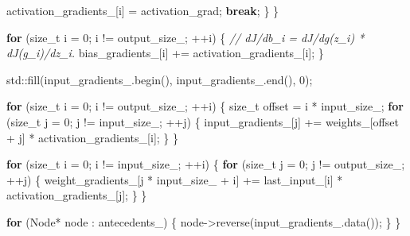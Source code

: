 \documentclass[
]{article}
\newenvironment{Shaded}{}{}
\newcommand{\BuiltInTok}[1]{#1}
\newcommand{\CommentTok}[1]{\textcolor[rgb]{0.38,0.63,0.69}{\textit{#1}}}
\newcommand{\ControlFlowTok}[1]{\textcolor[rgb]{0.00,0.44,0.13}{\textbf{#1}}}
\newcommand{\DataTypeTok}[1]{\textcolor[rgb]{0.56,0.13,0.00}{#1}}
\newcommand{\DecValTok}[1]{\textcolor[rgb]{0.25,0.63,0.44}{#1}}
\newcommand{\NormalTok}[1]{#1}
\newcommand{\VariableTok}[1]{\textcolor[rgb]{0.10,0.09,0.49}{#1}}
\begin{document}
\begin{Shaded}
\begin{Highlighting}[]
            \VariableTok{activation\_gradients\_}\NormalTok{[i] = activation\_grad;}
            \ControlFlowTok{break}\NormalTok{;}
\NormalTok{        \}}
\NormalTok{    \}}

    \ControlFlowTok{for}\NormalTok{ (}\DataTypeTok{size\_t}\NormalTok{ i = }\DecValTok{0}\NormalTok{; i != }\VariableTok{output\_size\_}\NormalTok{; ++i)}
\NormalTok{    \{}
        \CommentTok{// dJ/db\_i = dJ/dg(z\_i) * dJ(g\_i)/dz\_i.}
        \VariableTok{bias\_gradients\_}\NormalTok{[i] += }\VariableTok{activation\_gradients\_}\NormalTok{[i];}
\NormalTok{    \}}

    \BuiltInTok{std::}\NormalTok{fill(}\VariableTok{input\_gradients\_}\NormalTok{.begin(), }\VariableTok{input\_gradients\_}\NormalTok{.end(), }\DecValTok{0}\NormalTok{);}

    \ControlFlowTok{for}\NormalTok{ (}\DataTypeTok{size\_t}\NormalTok{ i = }\DecValTok{0}\NormalTok{; i != }\VariableTok{output\_size\_}\NormalTok{; ++i)}
\NormalTok{    \{}
        \DataTypeTok{size\_t}\NormalTok{ offset = i * }\VariableTok{input\_size\_}\NormalTok{;}
        \ControlFlowTok{for}\NormalTok{ (}\DataTypeTok{size\_t}\NormalTok{ j = }\DecValTok{0}\NormalTok{; j != }\VariableTok{input\_size\_}\NormalTok{; ++j)}
\NormalTok{        \{}
            \VariableTok{input\_gradients\_}\NormalTok{[j]}
\NormalTok{                += }\VariableTok{weights\_}\NormalTok{[offset + j] * }\VariableTok{activation\_gradients\_}\NormalTok{[i];}
\NormalTok{        \}}
\NormalTok{    \}}

    \ControlFlowTok{for}\NormalTok{ (}\DataTypeTok{size\_t}\NormalTok{ i = }\DecValTok{0}\NormalTok{; i != }\VariableTok{input\_size\_}\NormalTok{; ++i)}
\NormalTok{    \{}
        \ControlFlowTok{for}\NormalTok{ (}\DataTypeTok{size\_t}\NormalTok{ j = }\DecValTok{0}\NormalTok{; j != }\VariableTok{output\_size\_}\NormalTok{; ++j)}
\NormalTok{        \{}
            \VariableTok{weight\_gradients\_}\NormalTok{[j * }\VariableTok{input\_size\_}\NormalTok{ + i]}
\NormalTok{                += }\VariableTok{last\_input\_}\NormalTok{[i] * }\VariableTok{activation\_gradients\_}\NormalTok{[j];}
\NormalTok{        \}}
\NormalTok{    \}}

    \ControlFlowTok{for}\NormalTok{ (Node* node : }\VariableTok{antecedents\_}\NormalTok{)}
\NormalTok{    \{}
\NormalTok{        node{-}\textgreater{}reverse(}\VariableTok{input\_gradients\_}\NormalTok{.data());}
\NormalTok{    \}}
\NormalTok{\}}
\end{Highlighting}
\end{Shaded}
\end{document}
